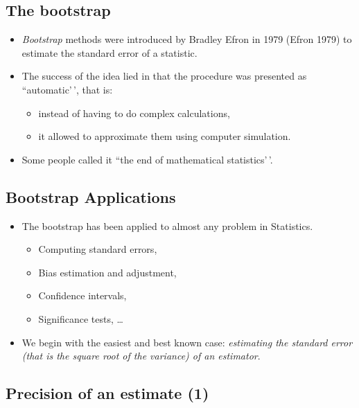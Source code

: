 \documentclass[
  letterpaper,
  DIV=11,
  numbers=noendperiod]{scrartcl}
\providecommand{\tightlist}{%
  \setlength{\itemsep}{0pt}\setlength{\parskip}{0pt}}\usepackage{longtable,booktabs,array}
\begin{document}
\hypertarget{the-bootstrap}{%
\subsection{The bootstrap}\label{the-bootstrap}}

\begin{itemize}
\tightlist
\item
  \emph{Bootstrap} methods were introduced by Bradley Efron in 1979
  (Efron 1979) to estimate the standard error of a statistic.
\item
  The success of the idea lied in that the procedure was presented as
  ``automatic'\,', that is:

  \begin{itemize}
  \tightlist
  \item
    instead of having to do complex calculations,
  \item
    it allowed to approximate them using computer simulation.
  \end{itemize}
\item
  Some people called it ``the end of mathematical statistics'\,'.
\end{itemize}

\hypertarget{bootstrap-applications}{%
\subsection{Bootstrap Applications}\label{bootstrap-applications}}

\begin{itemize}
\item
  The bootstrap has been applied to almost any problem in Statistics.

  \begin{itemize}
  \tightlist
  \item
    Computing standard errors,
  \item
    Bias estimation and adjustment,
  \item
    Confidence intervals,
  \item
    Significance tests, \ldots{}
  \end{itemize}
\item
  We begin with the easiest and best known case: \emph{estimating the
  standard error (that is the square root of the variance) of an
  estimator}.
\end{itemize}

\hypertarget{precision-of-an-estimate-1}{%
\subsection{Precision of an estimate
(1)}\label{precision-of-an-estimate-1}}
\end{document}
